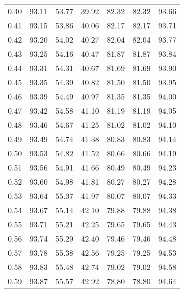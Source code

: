 \begin{tabular}{|c|c|c|c|c|c|c|}
      0.40 &     93.11 &     53.77 &      39.92 &   82.32 &      82.32 &         93.66 \\
      0.41 &     93.15 &     53.86 &      40.06 &   82.17 &      82.17 &         93.71 \\
      0.42 &     93.20 &     54.02 &      40.27 &   82.04 &      82.04 &         93.77 \\
      0.43 &     93.25 &     54.16 &      40.47 &   81.87 &      81.87 &         93.84 \\
      0.44 &     93.31 &     54.31 &      40.67 &   81.69 &      81.69 &         93.90 \\
      0.45 &     93.35 &     54.39 &      40.82 &   81.50 &      81.50 &         93.95 \\
      0.46 &     93.39 &     54.49 &      40.97 &   81.35 &      81.35 &         94.00 \\
      0.47 &     93.42 &     54.58 &      41.10 &   81.19 &      81.19 &         94.05 \\
      0.48 &     93.46 &     54.67 &      41.25 &   81.02 &      81.02 &         94.10 \\
      0.49 &     93.49 &     54.74 &      41.38 &   80.83 &      80.83 &         94.14 \\
      0.50 &     93.53 &     54.82 &      41.52 &   80.66 &      80.66 &         94.19 \\
      0.51 &     93.56 &     54.91 &      41.66 &   80.49 &      80.49 &         94.23 \\
      0.52 &     93.60 &     54.98 &      41.81 &   80.27 &      80.27 &         94.28 \\
      0.53 &     93.64 &     55.07 &      41.97 &   80.07 &      80.07 &         94.33 \\
      0.54 &     93.67 &     55.14 &      42.10 &   79.88 &      79.88 &         94.38 \\
      0.55 &     93.71 &     55.21 &      42.25 &   79.65 &      79.65 &         94.43 \\
      0.56 &     93.74 &     55.29 &      42.40 &   79.46 &      79.46 &         94.48 \\
      0.57 &     93.78 &     55.38 &      42.56 &   79.25 &      79.25 &         94.53 \\
      0.58 &     93.83 &     55.48 &      42.74 &   79.02 &      79.02 &         94.58 \\
      0.59 &     93.87 &     55.57 &      42.92 &   78.80 &      78.80 &         94.64 \\

\end{tabular}
